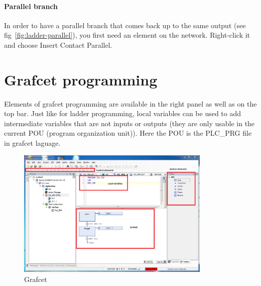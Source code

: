 \documentclass[10pt,a4paper]{article}
\begin{document}
\paragraph{Parallel branch}
In order to have a parallel branch that comes back up to the same output (see fig~\ref{fig:ladder-parallel}), you first need an element on the network.
Right-click it and choose Insert Contact Parallel.




\section{Grafcet programming}

Elements of grafcet programming are available in the right panel as well as on the top bar.
Just like for ladder programming, local variables can be used to add intermediate variables that are not inputs or outputs (they are only usable in the current POU (program organization unit)). Here the POU is the PLC\_PRG file in grafcet laguage.

\begin{figure}[h!]
	\begin{center}
		\includegraphics[width=350px]{img13.PNG}
	\end{center}
\caption{Grafcet}
\label{fig:grafcet}
\end{figure}
\end{document}
